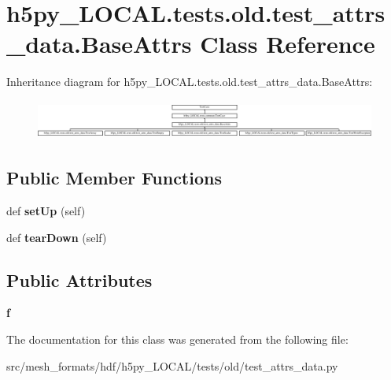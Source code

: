 \hypertarget{classh5py__LOCAL_1_1tests_1_1old_1_1test__attrs__data_1_1BaseAttrs}{}\section{h5py\+\_\+\+L\+O\+C\+A\+L.\+tests.\+old.\+test\+\_\+attrs\+\_\+data.\+Base\+Attrs Class Reference}
\label{classh5py__LOCAL_1_1tests_1_1old_1_1test__attrs__data_1_1BaseAttrs}
Inheritance diagram for h5py\+\_\+\+L\+O\+C\+A\+L.\+tests.\+old.\+test\+\_\+attrs\+\_\+data.\+Base\+Attrs\+:\begin{figure}[H]
\begin{center}
\leavevmode
\includegraphics[height=1.306122cm]{classh5py__LOCAL_1_1tests_1_1old_1_1test__attrs__data_1_1BaseAttrs}
\end{center}
\end{figure}
\subsection*{Public Member Functions}
\begin{DoxyCompactItemize}
\item 
\mbox{\label{classh5py__LOCAL_1_1tests_1_1old_1_1test__attrs__data_1_1BaseAttrs_abb4dc1916e3f05005a6adec5f400c356}} 
def {\bfseries set\+Up} (self)
\item 
\mbox{\label{classh5py__LOCAL_1_1tests_1_1old_1_1test__attrs__data_1_1BaseAttrs_aa9baac7272ccf9148f43776a248cc248}} 
def {\bfseries tear\+Down} (self)
\end{DoxyCompactItemize}
\subsection*{Public Attributes}
\begin{DoxyCompactItemize}
\item 
\mbox{\label{classh5py__LOCAL_1_1tests_1_1old_1_1test__attrs__data_1_1BaseAttrs_af70bbf37830fdc94dcc7bd6402604472}} 
{\bfseries f}
\end{DoxyCompactItemize}


The documentation for this class was generated from the following file\+:\begin{DoxyCompactItemize}
\item 
src/mesh\+\_\+formats/hdf/h5py\+\_\+\+L\+O\+C\+A\+L/tests/old/test\+\_\+attrs\+\_\+data.\+py\end{DoxyCompactItemize}
